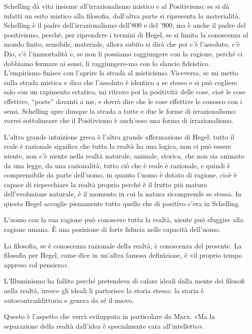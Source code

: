 \documentclass[a4paper,12pt,oneside,openany]{book}%
\begin{document}
Schelling dà vita insieme all’irrazionalismo mistico e al Positivismo; se si dà infatti un esito mistico alla filosofia, dall’altra parte si ripresenta la materialità. Schelling è il padre dell’irrazionalismo dell’800 e del ’900, ma è anche il padre del positivismo, perché, per riprendere i termini di Hegel, se si limita la conoscenza al mondo finito, sensibile, materiale, allora subito si dirà che poi c’è l’assoluto, c’è Dio, c’è l’immortalità e, se non li possiamo raggiungere con la ragione, perché ci dobbiamo fermare ai sensi, li raggiungere-mo con lo slancio fideistico. L’empirismo finisce con l’aprire la strada al misticismo. Viceversa, se mi metto sulla strada mistica e dico che l’assoluto è identico a se stesso e si può cogliere solo con un rapimento estatico, mi ritrovo poi la positività delle cose, cioè le cose effettive, “poste” davanti a me, e dovrò dire che le cose effettive le conosco con i sensi. Schelling apre dunque la strada a tutte e due le forme di irrazionalismo: vorrei sottolineare che il Positivismo è anch’esso una forma di irrazionalismo.	
	
L’altra grande intuizione greca è l’altra grande affermazione di Hegel: tutto il reale è razionale significa che tutta la realtà ha una logica, non ci può essere niente, non c’è niente nella realtà naturale, animale, storica, che non sia animato da una legge, da una razionalità; tutto ciò che è reale è razionale, e quindi è comprensibile da parte dell’uomo, in quanto l’uomo è dotato di ragione, cioè è capace di rispecchiare la realtà proprio perché è il frutto più maturo dell’evoluzione naturale, è il momento in cui la natura ricomprende se stessa. In questo Hegel accoglie pienamente tutto quello che di positivo c’era in Schelling.

L’uomo con la sua ragione può conoscere tutta la realtà, niente può sfuggire alla ragione umana. È una posizione di forte fiducia nelle capacità dell’uomo.	
	
La filosofia, se è conoscenza razionale della realtà, è conoscenza del presente. La filosofia per Hegel, come dice in un’altra famosa definizione, è «il proprio tempo appreso col pensiero».

L’Illuminismo ha fallito perché pretendeva di calare ideali dalla mente dei filosofi nella realtà, invece gli ideali li partorisce la storia stessa: la storia è autocontraddittoria e genera da sé il nuovo.

Questo è l’aspetto che verrà sviluppato in particolare da Marx. «Ma la separazione della realtà dall’idea è specialmente cara all’intelletto».
\end{document}
